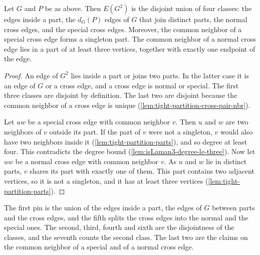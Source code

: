 \begin{lemma}
  \label{lem:square-cross-classification}
  \leanok
  Let $G$ and $P$ be as above. Then $E(G^2)$ is the disjoint union of
  four classes: the edges inside a part, the $d_G(P)$ edges of $G$ that
  join distinct parts, the normal cross edges, and the special cross
  edges. Moreover, the common neighbor of a special cross edge forms a
  singleton part. The common neighbor of a normal cross edge lies in a
  part of at least three vertices, together with exactly one endpoint of
  the edge.
\end{lemma}
\begin{proof}
  \leanok
  An edge of $G^2$ lies inside a part or joins two parts. In the latter
  case it is an edge of $G$ or a cross edge, and a cross edge is normal
  or special. The first three classes are disjoint by definition. The
  last two are disjoint because the common neighbor of a cross edge is
  unique (\cref{lem:tight-partition-cross-pair-nbr}).

  Let $uw$ be a special cross edge with common neighbor $v$. Then $u$ and
  $w$ are two neighbors of $v$ outside its part. If the part of $v$ were
  not a singleton, $v$ would also have two neighbors inside it
  (\cref{lem:tight-partition-parts}), and so degree at least four. This
  contradicts the degree bound (\cref{lem:isLaman3-degree-le-three}).
  Now let $uw$ be a normal cross edge with common neighbor $v$. As $u$
  and $w$ lie in distinct parts, $v$ shares its part with exactly one of
  them. This part contains two adjacent vertices, so it is not a
  singleton, and it has at least three vertices
  (\cref{lem:tight-partition-parts}).
\end{proof}

\begin{fmlnote}
  The first pin is the union of the edges inside a part, the edges of
  $G$ between parts and the cross edges, and the fifth splits the cross
  edges into the normal and the special ones. The second, third, fourth
  and sixth are the disjointness of the classes, and the seventh counts
  the second class. The last two are the claims on the common neighbor
  of a special and of a normal cross edge.
\end{fmlnote}

